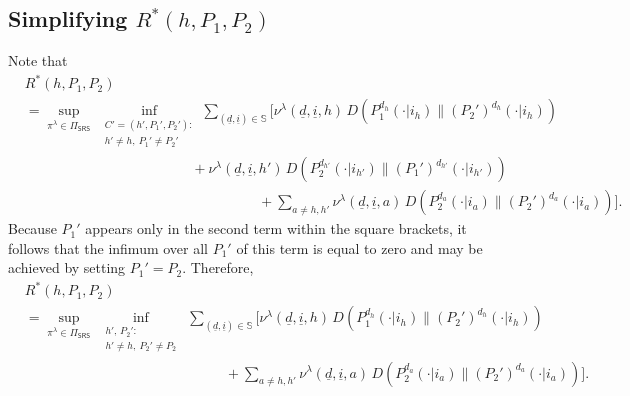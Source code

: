 \subsection{Simplifying $R^*(h, P_1, P_2)$}
Note that
\begin{align}
	& R^*(h,P_1,P_2)\nonumber\\
	&= \sup\limits_{\pi^\lambda\in\Pi_{\textsf{SRS}}}\, \inf\limits_{\substack{C'=(h', P_1', P_2'):\\h'\neq h,~P_1'\neq P_2'}}\sum\limits_{(\underline{d},\underline{i})\in\mathbb{S}}\bigg[\nu^\lambda(\underline{d},\underline{i},h) \,D(P_1^{d_h}(\cdot|i_h)\|(P_2')^{d_h}(\cdot|i_h))\nonumber\\
	&\hspace{5cm} + \nu^\lambda(\underline{d},\underline{i},h') \,D(P_2^{d_{h'}}(\cdot|i_{h'})\|(P_1')^{d_{h'}}(\cdot|i_{h'})) \nonumber\\
	&\hspace{7cm}+ \sum\limits_{a\neq h, h'}\nu^\lambda(\underline{d},\underline{i},a) \,D(P_2^{d_a}(\cdot|i_a)\|(P_2')^{d_a}(\cdot|i_a))\bigg].
	\label{eq:simplifying_R*_1}
\end{align}
Because $P_1'$ appears only in the second term within the square brackets, it follows that the infimum over all $P_1'$ of this term is equal to zero and may be achieved by setting $P_1'=P_2$. Therefore,
\begin{align}
	& R^*(h,P_1,P_2)\nonumber\\
	&= \sup\limits_{\pi^\lambda\in\Pi_{\textsf{SRS}}}~ \inf\limits_{\substack{h', \, P_2':\\h'\neq h,~P_2'\neq P_2}}~\sum\limits_{(\underline{d},\underline{i})\in\mathbb{S}}\bigg[\nu^\lambda(\underline{d},\underline{i},h) \,D(P_1^{d_h}(\cdot|i_h)\|(P_2')^{d_h}(\cdot|i_h))\nonumber\\
	&\hspace{6cm}+ \sum\limits_{a\neq h, h'}\nu^\lambda(\underline{d},\underline{i},a) \,D(P_2^{d_a}(\cdot|i_a)\|(P_2')^{d_a}(\cdot|i_a))\bigg].
	\label{eq:simplifying_R*_2}
\end{align}

